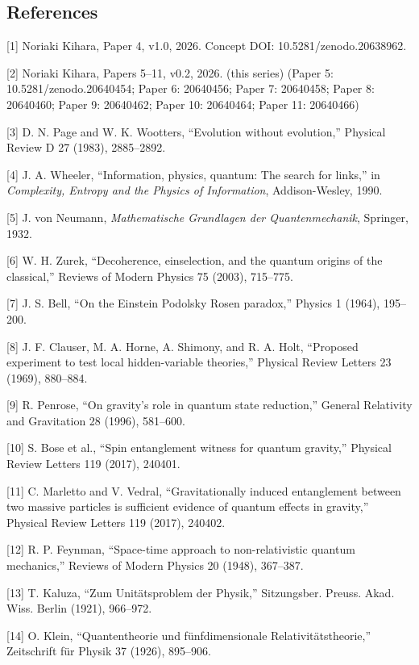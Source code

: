 \documentclass[
]{article}
\begin{document}
\subsection{References}\label{references}

{[}1{]} Noriaki Kihara, Paper 4, v1.0, 2026. Concept DOI:
10.5281/zenodo.20638962.

{[}2{]} Noriaki Kihara, Papers 5--11, v0.2, 2026. (this series) (Paper 5: 10.5281/zenodo.20640454; Paper 6: 20640456; Paper 7: 20640458; Paper 8: 20640460; Paper 9: 20640462; Paper 10: 20640464; Paper 11: 20640466)

{[}3{]} D. N. Page and W. K. Wootters, ``Evolution without evolution,''
Physical Review D 27 (1983), 2885--2892.

{[}4{]} J. A. Wheeler, ``Information, physics, quantum: The search for
links,'' in \emph{Complexity, Entropy and the Physics of Information},
Addison-Wesley, 1990.

{[}5{]} J. von Neumann, \emph{Mathematische Grundlagen der
Quantenmechanik}, Springer, 1932.

{[}6{]} W. H. Zurek, ``Decoherence, einselection, and the quantum
origins of the classical,'' Reviews of Modern Physics 75 (2003),
715--775.

{[}7{]} J. S. Bell, ``On the Einstein Podolsky Rosen paradox,'' Physics
1 (1964), 195--200.

{[}8{]} J. F. Clauser, M. A. Horne, A. Shimony, and R. A. Holt,
``Proposed experiment to test local hidden-variable theories,'' Physical
Review Letters 23 (1969), 880--884.

{[}9{]} R. Penrose, ``On gravity's role in quantum state reduction,''
General Relativity and Gravitation 28 (1996), 581--600.

{[}10{]} S. Bose et al., ``Spin entanglement witness for quantum
gravity,'' Physical Review Letters 119 (2017), 240401.

{[}11{]} C. Marletto and V. Vedral, ``Gravitationally induced
entanglement between two massive particles is sufficient evidence of
quantum effects in gravity,'' Physical Review Letters 119 (2017),
240402.

{[}12{]} R. P. Feynman, ``Space-time approach to non-relativistic
quantum mechanics,'' Reviews of Modern Physics 20 (1948), 367--387.

{[}13{]} T. Kaluza, ``Zum Unitätsproblem der Physik,'' Sitzungsber.
Preuss. Akad. Wiss. Berlin (1921), 966--972.

{[}14{]} O. Klein, ``Quantentheorie und fünfdimensionale
Relativitätstheorie,'' Zeitschrift für Physik 37 (1926), 895--906.
\end{document}
